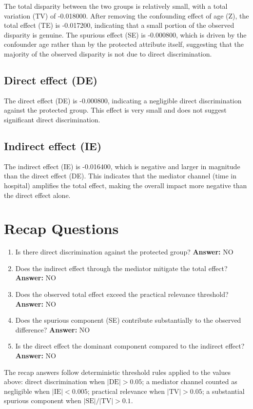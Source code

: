 \documentclass[11pt]{article}
\begin{document}
The total disparity between the two groups is relatively small, with a total variation (TV) of -0.018000. After removing the confounding effect of age (Z), the total effect (TE) is -0.017200, indicating that a small portion of the observed disparity is genuine. The spurious effect (SE) is -0.000800, which is driven by the confounder age rather than by the protected attribute itself, suggesting that the majority of the observed disparity is not due to direct discrimination.

\subsection{Direct effect (DE)}

The direct effect (DE) is -0.000800, indicating a negligible direct discrimination against the protected group. This effect is very small and does not suggest significant direct discrimination.

\subsection{Indirect effect (IE)}

The indirect effect (IE) is -0.016400, which is negative and larger in magnitude than the direct effect (DE). This indicates that the mediator channel (time in hospital) amplifies the total effect, making the overall impact more negative than the direct effect alone.

\section{Recap Questions}

\begin{enumerate}
\item Is there direct discrimination against the protected group? \textbf{Answer:} NO
\item Does the indirect effect through the mediator mitigate the total effect? \textbf{Answer:} NO
\item Does the observed total effect exceed the practical relevance threshold? \textbf{Answer:} NO
\item Does the spurious component (SE) contribute substantially to the observed difference? \textbf{Answer:} NO
\item Is the direct effect the dominant component compared to the indirect effect? \textbf{Answer:} NO
\end{enumerate}

\vspace{1em}
\noindent\footnotesize
The recap answers follow deterministic threshold rules applied to the values above: direct discrimination when $|\mathrm{DE}| > 0.05$; a mediator channel counted as negligible when $|\mathrm{IE}| < 0.005$; practical relevance when $|\mathrm{TV}| > 0.05$; a substantial spurious component when $|\mathrm{SE}| / |\mathrm{TV}| > 0.1$.
\end{document}
